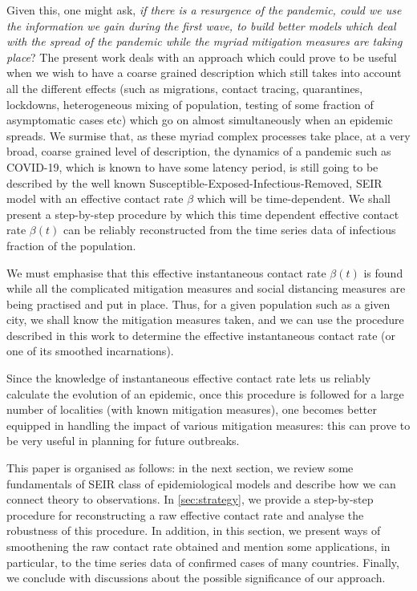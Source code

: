 \documentclass[aps,prd,10pt,twocolumn,nofootinbib]{revtex4-2}
\begin{document}
Given this, one might ask, {\it if there is a resurgence of the pandemic, could we use the information we gain during the first wave, to build better models which deal with the spread of the pandemic while the myriad mitigation measures are taking place}?
The present work deals with an approach which could prove to be useful when we wish to have a coarse grained description which still takes into account all the different effects (such as migrations, contact tracing, quarantines, lockdowns, heterogeneous mixing of population, testing of some fraction of asymptomatic cases etc) which go on almost simultaneously when an epidemic spreads. We surmise that, as these myriad complex processes take place, at a very broad, coarse grained level of description, the dynamics of a pandemic such as COVID-19, which is known to have some latency period, is still going to be described by the well known Susceptible-Exposed-Infectious-Removed, SEIR model \cite{Book_2008,Book_2018} with an effective contact rate $\beta$ which will be time-dependent. 
We shall present a step-by-step procedure by which this time dependent effective contact rate $\beta (t)$ can be reliably reconstructed from the time series data of infectious fraction of the population.

We must emphasise that this effective instantaneous contact rate $\beta (t)$ is found while all the complicated mitigation measures and social distancing measures are being practised and put in place. Thus, for a given population such as a given city, we shall know the mitigation measures taken, and we can use the procedure described in this work to determine the effective instantaneous contact rate (or one of its smoothed incarnations). 

Since the knowledge of instantaneous effective contact rate lets us reliably calculate the evolution of an epidemic, once this procedure is followed for a large number of localities (with known mitigation measures), one becomes better equipped in handling the impact of various mitigation measures: this can prove to be very useful in planning for future outbreaks.

This paper is organised as follows: in the next section, we review some fundamentals of SEIR class of epidemiological models and describe how we can connect theory to observations. In  \textsection \ref{sec:strategy}, we provide a step-by-step procedure for reconstructing a raw effective contact rate and analyse the robustness of this procedure. In addition, in this section, we present ways of smoothening the raw contact rate obtained and mention some applications, in particular, to the time series data of confirmed cases of many countries. Finally, we conclude with discussions about the possible significance of our approach.
\end{document}
